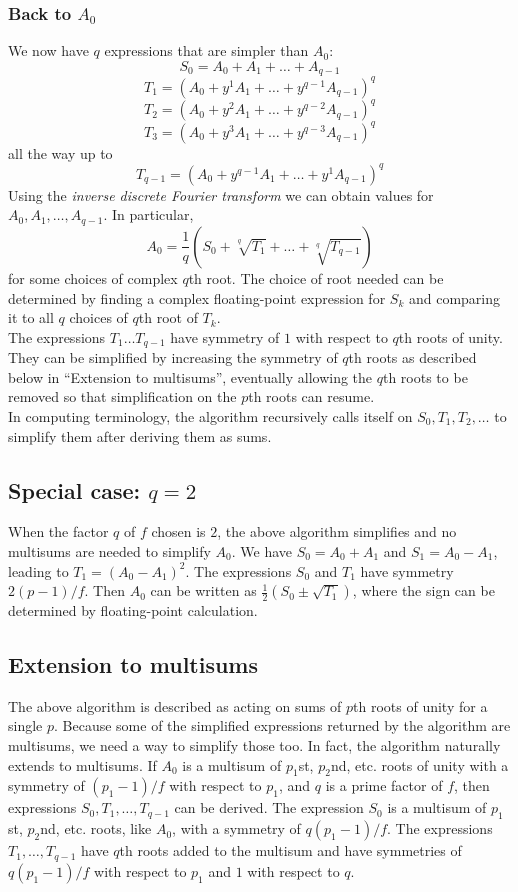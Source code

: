 \documentclass{article}
\begin{document}
\subsubsection{Back to $ A_0 $}
    We now have $ q $ expressions that are simpler than $ A_0 $:\\
    $$ S_0 = A_0 + A_1 + \dots + A_{q - 1} $$
    $$ T_1 = (A_0 + y^1 A_1 + \dots + y^{q - 1} A_{q - 1})^q $$
    $$ T_2 = (A_0 + y^2 A_1 + \dots + y^{q - 2} A_{q - 1})^q $$
    $$ T_3 = (A_0 + y^3 A_1 + \dots + y^{q - 3} A_{q - 1})^q $$
    all the way up to
    $$ T_{q - 1} = (A_0 + y^{q - 1} A_1 + \dots + y^1 A_{q - 1})^q $$
    Using the \textit{inverse discrete Fourier transform} we can obtain values for $ A_0, A_1, \dots, A_{q - 1} $. In particular,
    $$ A_0 = \frac{1}{q} (S_0 + \sqrt[q]{T_1} + \dots + \sqrt[q]{T_{q - 1}}) $$
    for some choices of complex $ q $th root. The choice of root needed can be determined by finding a complex floating-point expression for $ S_k $ and comparing it to all $ q $ choices of $ q $th root of $ T_k $.\\
    The expressions $ T_1 \dots T_{q - 1} $ have symmetry of $ 1 $ with respect to $ q $th roots of unity. They can be simplified by increasing the symmetry of $ q $th roots as described below in ``Extension to multisums'', eventually allowing the $ q $th roots to be removed so that simplification on the $ p $th roots can resume.\\
    In computing terminology, the algorithm recursively calls itself on $ S_0, T_1, T_2, \dots $ to simplify them after deriving them as sums.\\
\subsection{Special case: $ q = 2 $}
    When the factor $ q $ of $ f $ chosen is $ 2 $, the above algorithm simplifies and no multisums are needed to simplify $ A_0 $. We have $ S_0 = A_0 + A_1 $ and $ S_1 = A_0 - A_1 $, leading to $ T_1 = (A_0 - A_1)^2 $. The expressions $ S_0 $ and $ T_1 $ have symmetry $ 2(p - 1)/f $. Then $ A_0 $ can be written as $ \frac{1}{2} (S_0 \pm \sqrt{T_1}) $, where the sign can be determined by floating-point calculation.\\
\subsection{Extension to multisums}
    The above algorithm is described as acting on sums of $ p $th roots of unity for a single $ p $. Because some of the simplified expressions returned by the algorithm are multisums, we need a way to simplify those too. In fact, the algorithm naturally extends to multisums. If $ A_0 $ is a multisum of $ p_1 $st, $ p_2 $nd, etc. roots of unity with a symmetry of $ (p_1 - 1)/f $ with respect to $ p_1 $, and $ q $ is a prime factor of $ f $, then expressions $ S_0, T_1, \dots, T_{q - 1} $ can be derived. The expression $ S_0 $ is a multisum of $ p_1 $st, $ p_2 $nd, etc. roots, like $ A_0 $, with a symmetry of $ q(p_1 - 1)/f $. The expressions $ T_1, \dots, T_{q - 1} $ have $ q $th roots added to the multisum and have symmetries of $ q(p_1 - 1)/f $ with respect to $ p_1 $ and $ 1 $ with respect to $ q $.\\
\end{document}
